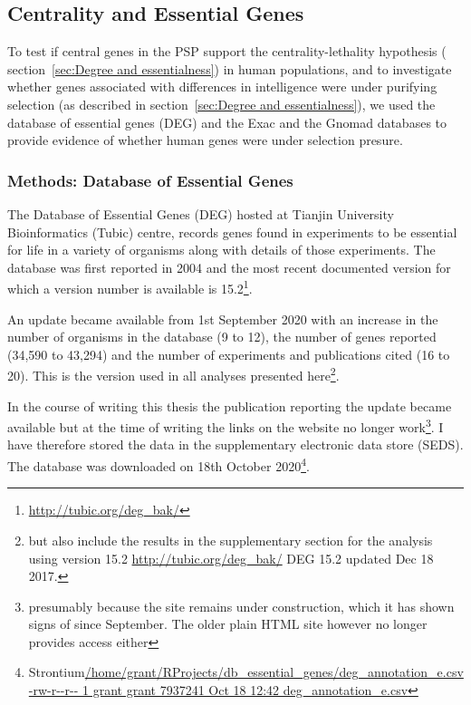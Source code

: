 \subsection{Centrality and Essential Genes}






\label{sec:centrality and essential genes}
To test if central genes in the PSP support the centrality-lethality hypothesis ( section~\ref{sec:Degree and essentialness}) in human populations,  and to investigate whether genes associated with differences in intelligence were under purifying selection (as described in \cite{hill2016molecular} section~\ref{sec:Degree and essentialness}), we used the database of essential genes (DEG)\cite{luo2021deg} and the Exac and the Gnomad databases to provide evidence of whether human genes were under selection presure.  

\subsubsection{Methods: Database of Essential Genes}
 \label{sec:Database of essential genes}
 
 
 
 The Database of Essential Genes (DEG) hosted at Tianjin University Bioinformatics (Tubic) centre, records genes found in experiments to be essential for life in a variety of organisms along with details of those experiments. The database was first reported in 2004 and the most recent documented version for which a version number is available is 15.2\footnote{\url{ http://tubic.org/deg_bak/}}\cite{luo2014deg}.
 
An update became available from 1st September 2020 with an increase in the number of organisms in the database (9 to 12), the number of genes reported (34,590 to 43,294) and the number of experiments and publications cited (16 to 20). This is the version used in all analyses presented here\footnote{but also include the results in the supplementary section for the analysis using version 15.2 \url{ http://tubic.org/deg_bak/} DEG 15.2 updated Dec 18 2017\cite{luo2014deg}.}.
 
 In the course of writing this thesis the publication reporting the update became available\cite{luo2021deg} but at the time of writing the links on the website no longer work\footnote{presumably because the site remains under construction, which it has shown signs of since September. The older plain HTML site however no longer provides access either}. I have therefore stored the data in the supplementary electronic data store (SEDS). The database was downloaded on 18th October 2020\footnote{Strontium\url{/home/grant/RProjects/db_essential_genes/deg_annotation_e.csv} \url{-rw-r--r-- 1 grant grant 7937241 Oct 18 12:42 deg_annotation_e.csv}}.
 
